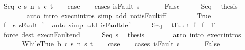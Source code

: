 \begin{isabellebody}
\ {\isacharparenleft}Seq\ c{}\ s\ n\ s{\isacharprime}\ c{}\ t{\isacharparenright}\isanewline
\ \ \isamarkupfalse%
\ {\isacharquery}case\isanewline
\ \ \isamarkupfalse%
\ {\isacharparenleft}cases\ {\isachardoublequoteopen}isFault\ s{\isacharprime}{\isachardoublequoteclose}{\isacharparenright}\ \isanewline
\ \ \ \ \isamarkupfalse%
\ False\isanewline
\ \ \ \ \isamarkupfalse%
\ Seq\ \isamarkupfalse%
\ {\isacharquery}thesis\isanewline
\ \ \ \ \ \ \isamarkupfalse%
\ {\isacharparenleft}auto\ intro{\isacharcolon}\ execn{\isachardot}intros\ simp\ add{\isacharcolon}\ not{\isacharunderscore}isFault{\isacharunderscore}iff{\isacharparenright}\isanewline
\ \ \isamarkupfalse%
\isanewline
\ \ \ \ \isamarkupfalse%
\ True\isanewline
\ \ \ \ \isamarkupfalse%
\ \isamarkupfalse%
\ f{\isacharprime}\ \ s{\isacharprime}{\isacharcolon}\ {\isachardoublequoteopen}s{\isacharprime}{\isacharequal}Fault\ f{\isacharprime}{\isachardoublequoteclose}\ \isamarkupfalse%
\ {\isacharparenleft}auto\ simp\ add{\isacharcolon}\ isFault{\isacharunderscore}def{\isacharparenright}\isanewline
\ \ \ \ \isamarkupfalse%
\ Seq\ \isamarkupfalse%
\ {\isachardoublequoteopen}t{\isacharequal}Fault\ f{\isacharprime}{\isachardoublequoteclose}\ \ {\isachardoublequoteopen}f{\isacharprime}\ {\isasymnotin}\ F{\isachardoublequoteclose}\isanewline
\ \ \ \ \ \ \isamarkupfalse%
\ {\isacharparenleft}force\ dest{\isacharcolon}\ execn{\isacharunderscore}Fault{\isacharunderscore}end{\isacharparenright}\isanewline
\ \ \ \ \isamarkupfalse%
\ Seq\ s{\isacharprime}\ \isamarkupfalse%
\ {\isacharquery}thesis\isanewline
\ \ \ \ \ \ \isamarkupfalse%
\ {\isacharparenleft}auto\ intro{\isacharcolon}\ execn{\isachardot}intros{\isacharparenright}\isanewline
\ \ \isamarkupfalse%
\isanewline
{}\isamarkupfalse%
\isanewline
\ \ \isamarkupfalse%
\ {\isacharparenleft}WhileTrue\ b\ c\ s\ n\ s{\isacharprime}\ t{\isacharparenright}\isanewline
\ \ \isamarkupfalse%
\ {\isacharquery}case\isanewline
\ \ \isamarkupfalse%
\ {\isacharparenleft}cases\ {\isachardoublequoteopen}isFault\ s{\isacharprime}{\isachardoublequoteclose}{\isacharparenright}\ \isanewline
\ \ \ \ \isamarkupfalse%
\ False\isanewline
\ \ \ \ \isamarkupfalse%

\end{isabellebody}
